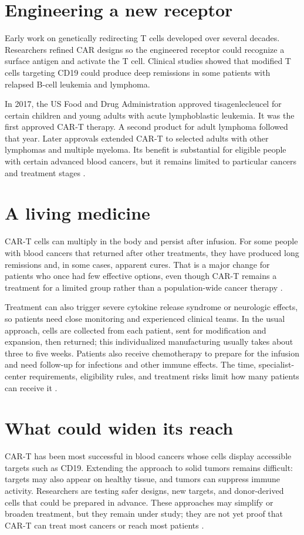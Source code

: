 \documentclass[12pt,oneside]{book}
\begin{document}
\section{Engineering a new receptor}
Early work on genetically redirecting T cells developed over several decades.
Researchers refined CAR designs so the engineered receptor could recognize a
surface antigen and activate the T cell. Clinical studies showed that modified
T cells targeting CD19 could produce deep remissions in some patients with
relapsed B-cell leukemia and lymphoma.

In 2017, the US Food and Drug Administration approved tisagenlecleucel for
certain children and young adults with acute lymphoblastic leukemia. It was
the first approved CAR-T therapy. A second product for adult lymphoma followed
that year. Later approvals extended CAR-T to selected adults with other
lymphomas and multiple myeloma. Its benefit is substantial for eligible people
with certain advanced blood cancers, but it remains limited to particular
cancers and treatment stages \cite{nciCART}.

\section{A living medicine}
CAR-T cells can multiply in the body and persist after infusion. For some people
with blood cancers that returned after other treatments, they have produced
long remissions and, in some cases, apparent cures. That is a major change for
patients who once had few effective options, even though CAR-T remains a
treatment for a limited group rather than a population-wide cancer therapy
\cite{nciCART}.

Treatment can also trigger severe cytokine release syndrome or neurologic
effects, so patients need close monitoring and experienced clinical teams. In
the usual approach, cells are collected from each patient, sent for modification
and expansion, then returned; this individualized manufacturing usually takes
about three to five weeks. Patients also receive chemotherapy to prepare for
the infusion and need follow-up for infections and other immune effects. The
time, specialist-center requirements, eligibility rules, and treatment risks
limit how many patients can receive it \cite{nciCART}.

\section{What could widen its reach}
CAR-T has been most successful in blood cancers whose cells display accessible
targets such as CD19. Extending the approach to solid tumors remains difficult:
targets may also appear on healthy tissue, and tumors can suppress immune
activity. Researchers are testing safer designs, new targets, and donor-derived
cells that could be prepared in advance. These approaches may simplify or
broaden treatment, but they remain under study; they are not yet proof that
CAR-T can treat most cancers or reach most patients \cite{nciCART}.
\end{document}
